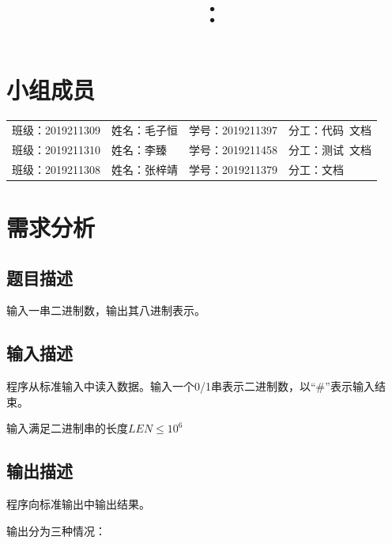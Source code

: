 \documentclass{article}
\title{\hmwkClass\ ：\hmwkTitle}
\author{\hmwkAuthorName}
\begin{document}
\maketitle  

\section*{小组成员}

\setlength{\tabcolsep}{9mm}
{
    \begin{table}[htbp]
        \centering
        \begin{tabular}{llll}
            班级：2019211309 & 姓名：毛子恒 & 学号：2019211397 & 分工：代码\ 文档 \\
            
            班级：2019211310 & 姓名：李臻   & 学号：2019211458 & 分工：测试\ 文档 \\
            
            班级：2019211308 & 姓名：张梓靖 & 学号：2019211379 & 分工：文档       \\
        \end{tabular}
    \end{table}
}

\tableofcontents
\newpage

\section{需求分析}

\subsection{题目描述}

输入一串二进制数，输出其八进制表示。

\subsection{输入描述}

程序从标准输入中读入数据。输入一个0/1串表示二进制数，以“\#”表示输入结束。

输入满足二进制串的长度$LEN\leq 10^6$

\subsection{输出描述}

程序向标准输出中输出结果。

输出分为三种情况：
\end{document}
